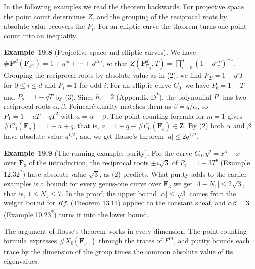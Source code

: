 \documentclass[11pt]{article}
\newenvironment{bpstatement}[2]{\par\addvspace{0.6\baselineskip}\noindent\textbf{#1}#2\textbf{.}\enspace\ignorespaces}
  {\par\addvspace{0.4\baselineskip}}
\newcommand{\bpout}[1]{#1\textsuperscript{\hyperlink{bp-outside}{\ensuremath{\ast}}}}
\begin{document}
\label{bp344}%
In the following examples we read the theorem backwards. For projective space the point count determines \(Z\), and the grouping of the reciprocal roots by absolute value recovers the \(P_i\). For an elliptic curve the theorem turns one point count into an inequality.

\label{bp345}%
\begin{bpstatement}{Example~19.8}{ (Projective space and elliptic curves)}
We have \(\#\mathbf P^d(\mathbf F_{q^m})=1+q^m+\cdots+q^{dm}\), so that \(Z(\mathbf P^d_{\mathbf F_q},T)=\prod_{i=0}^d(1-q^iT)^{-1}\). Grouping the reciprocal roots by absolute value as in (2), we find \(P_{2i}=1-q^iT\) for \(0\le i\le d\) and \(P_i=1\) for odd \(i\). For an elliptic curve \(C_0\), we have \(P_0=1-T\) and \(P_2=1-qT\) by (3). Since \(b_1=2\) (Appendix \bpout{D}), the polynomial \(P_1\) has two reciprocal roots \(\alpha,\beta\). Poincaré duality matches them as \(\beta=q/\alpha\), so \(P_1=1-aT+qT^2\) with \(a=\alpha+\beta\). The point-counting formula for \(m=1\) gives \(\#C_0(\mathbf F_q)=1-a+q\), that is, \(a=1+q-\#C_0(\mathbf F_q)\in\mathbf Z\). By (2) both \(\alpha\) and \(\beta\) have absolute value \(q^{1/2}\), and we get Hasse's theorem \(|a|\le2q^{1/2}\).
\end{bpstatement}

\label{bp346}%
\begin{bpstatement}{Example~19.9}{ (The running example: purity)}
For the curve \(C_0\colon y^2=x^3-x\) over \(\mathbf F_3\) of the introduction, the reciprocal roots \(\pm i\sqrt3\) of \(P_1=1+3T^2\) (Example \bpout{12.32}) have absolute value \(\sqrt3\), as (2) predicts. What purity adds to the earlier examples is a bound: for every genus-one curve over \(\mathbf F_3\) we get \(|4-N_1|\le2\sqrt3\), that is, \(1\le N_1\le7\). In the proof, the upper bound \(|\alpha|\le\sqrt3\) comes from the weight bound for \(Rf_!\) (Theorem \hyperref[bp38]{13.11}) applied to the constant sheaf, and \(\alpha\beta=3\) (Example \bpout{10.23}) turns it into the lower bound.
\end{bpstatement}

\label{bp347}%
The argument of Hasse's theorem works in every dimension. The point-counting formula expresses \(\#X_0(\mathbf F_{q^m})\) through the traces of \(F^m\), and purity bounds each trace by the dimension of the group times the common absolute value of its eigenvalues.
\end{document}
